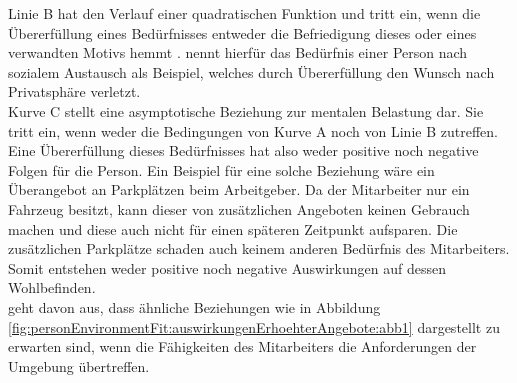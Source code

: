 Linie B hat den Verlauf einer quadratischen Funktion und tritt ein, wenn die Übererfüllung eines Bedürfnisses entweder die Befriedigung dieses oder eines verwandten Motivs hemmt \cite[S. 5]{caplan:1987}. \textcite{harrison:1978} nennt hierfür das Bedürfnis einer Person nach sozialem Austausch als Beispiel, welches durch Übererfüllung den Wunsch nach Privatsphäre verletzt.\\
Kurve C stellt eine asymptotische Beziehung zur mentalen Belastung dar. Sie tritt ein, wenn weder die Bedingungen von Kurve A noch von Linie B zutreffen. Eine Übererfüllung dieses Bedürfnisses hat also weder positive noch negative Folgen für die Person. Ein Beispiel für eine solche Beziehung wäre ein Überangebot an Parkplätzen beim Arbeitgeber. Da der Mitarbeiter nur ein Fahrzeug besitzt, kann dieser von zusätzlichen Angeboten keinen Gebrauch machen und diese auch nicht für einen späteren Zeitpunkt aufsparen. Die zusätzlichen Parkplätze schaden auch keinem anderen Bedürfnis des Mitarbeiters. Somit entstehen weder positive noch negative Auswirkungen auf dessen Wohlbefinden.\\
\textcite{harrison:1978} geht davon aus, dass ähnliche Beziehungen wie in Abbildung \ref{fig:personEnvironmentFit:auswirkungenErhoehterAngebote:abb1} dargestellt zu erwarten sind, wenn die Fähigkeiten des Mitarbeiters die Anforderungen der Umgebung übertreffen.\\


\newpage

